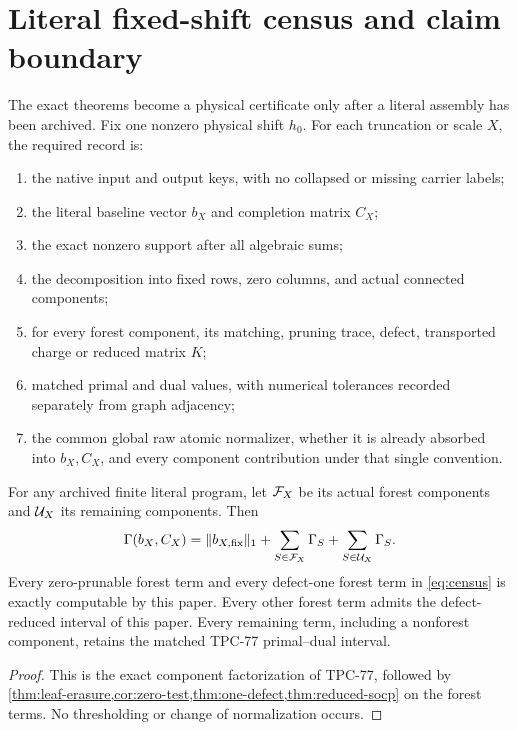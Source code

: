 \section{Literal fixed-shift census and claim boundary}
\label{sec:physical-boundary}

The exact theorems become a physical certificate only after a literal
assembly has been archived.  Fix one nonzero physical shift \(h_0\).
For each truncation or scale \(X\), the required record is:
\begin{enumerate}[label=(P\arabic*),leftmargin=2.7em]
\item the native input and output keys, with no collapsed or missing
carrier labels;
\item the literal baseline vector \(b_X\) and completion matrix \(C_X\);
\item the exact nonzero support after all algebraic sums;
\item the decomposition into fixed rows, zero columns, and actual
connected components;
\item for every forest component, its matching, pruning trace, defect,
transported charge or reduced matrix \(K\);
\item matched primal and dual values, with numerical tolerances recorded
separately from graph adjacency;
\item the common global raw atomic normalizer, whether it is already
absorbed into \(b_X,C_X\), and every component contribution under that
single convention.
\end{enumerate}

\begin{proposition}\label{prop:census}
For any archived finite literal program, let \(\mathcal F_X\) be its actual
forest components and \(\mathcal U_X\) its remaining components.  Then
\begin{equation}\label{eq:census}
 \Gamma(b_X,C_X)
 =
 \|b_{X,\mathrm{fix}}\|_1
 +\sum_{S\in\mathcal F_X}\Gamma_S
 +\sum_{S\in\mathcal U_X}\Gamma_S.
\end{equation}
Every zero-prunable forest term and every defect-one forest term in
\eqref{eq:census} is exactly computable by this paper.  Every other
forest term admits the defect-reduced interval of this paper.  Every
remaining term, including a nonforest component, retains the matched
TPC-77 primal--dual interval.
\end{proposition}

\begin{proof}
This is the exact component factorization of TPC-77, followed by
\cref{thm:leaf-erasure,cor:zero-test,thm:one-defect,thm:reduced-socp}
on the forest terms.  No thresholding or change of normalization occurs.
\end{proof}

